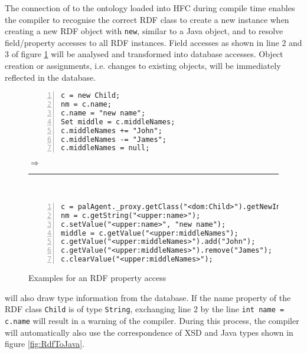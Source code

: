 The connection of \vonda to the ontology loaded into HFC during compile time
enables the compiler to recognise the correct RDF class to create a new
instance when creating a new RDF object with \texttt{new}, similar to a Java
object, and to resolve field/property accesses to all RDF instances. Field
accesses as shown in line 2 and 3 of figure \ref{fig:property-access} will be
analysed and transformed into database accesses. Object creation or
assignments, i.e. changes to existing objects, will be immediately reflected in
the database.


\begin{figure}[htbp]
\small\begin{minipage}{0.5\textwidth}
\begin{lstlisting}[numbers=left,numberstyle=\scriptsize]
c = new Child;
nm = c.name;
c.name = "new name";
Set middle = c.middleNames;
c.middleNames += "John";
c.middleNames -= "James";
c.middleNames = null;
\end{lstlisting}
\end{minipage}{\LARGE$\Rightarrow$}\rule{6.4cm}{0pt}\\
\begin{minipage}{0.99\textwidth}
\begin{lstlisting}[numbers=left,numberstyle=\scriptsize]
c = palAgent._proxy.getClass("<dom:Child>").getNewInstance(palAgent.DEFNS);
nm = c.getString("<upper:name>");
c.setValue("<upper:name>", "new name");
middle = c.getValue("<upper:middleNames");
c.getValue("<upper:middleNames>").add("John");
c.getValue("<upper:middleNames>").remove("James");
c.clearValue("<upper:middleNames>");
\end{lstlisting}
\end{minipage}
  \caption{Examples for an RDF property access}
  \label{fig:property-access}
\end{figure}

\vonda will also draw type information from the database. If the name property
of the RDF class \texttt{Child} is of type \texttt{String}, exchanging line 2
by the line \texttt{int name = c.name} will result in a warning of the
compiler. During this process, the compiler will automatically also use the
correspondence of XSD and Java types shown in figure \ref{fig:RdfToJava}.

